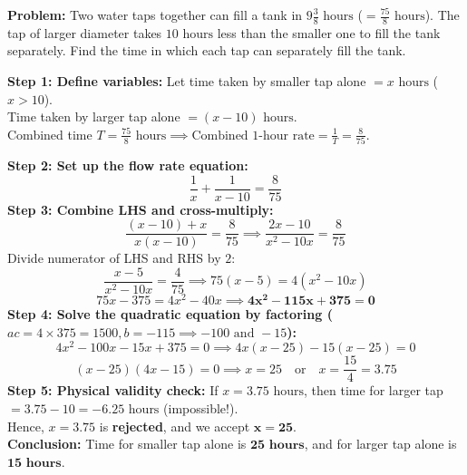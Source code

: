 \documentclass[10pt,a4paper]{article}
\begin{document}
\vspace{0.8mm}
\begin{conceptBox}[title={Worked Archetype 10 $\vert$ Two Water Taps Filling a Tank Together},fonttitle=\bfseries\color{navy}]
  \textbf{Problem:} Two water taps together can fill a tank in $9\frac{3}{8}\text{ hours}$ ($=\frac{75}{8}\text{ hours}$). The tap of larger diameter takes $10\text{ hours}$ less than the smaller one to fill the tank separately. Find the time in which each tap can separately fill the tank.
  \par\vspace{0.6mm}\noindent
  \textbf{Step 1: Define variables:}
  Let time taken by smaller tap alone $= x\text{ hours}$ ($x > 10$).\\
  Time taken by larger tap alone $= (x - 10)\text{ hours}$.\\
  Combined time $T = \frac{75}{8}\text{ hours} \implies \text{Combined 1-hour rate} = \frac{1}{T} = \frac{8}{75}$.
  \par\noindent
  \textbf{Step 2: Set up the flow rate equation:}
  $$\frac{1}{x} + \frac{1}{x - 10} = \frac{8}{75}$$
  \textbf{Step 3: Combine LHS and cross-multiply:}
  $$\frac{(x - 10) + x}{x(x - 10)} = \frac{8}{75} \implies \frac{2x - 10}{x^2 - 10x} = \frac{8}{75}$$
  Divide numerator of LHS and RHS by $2$:
  $$\frac{x - 5}{x^2 - 10x} = \frac{4}{75} \implies 75(x - 5) = 4(x^2 - 10x)$$
  $$75x - 375 = 4x^2 - 40x \implies \mathbf{4x^2 - 115x + 375 = 0}$$
  \textbf{Step 4: Solve the quadratic equation by factoring ($ac = 4 \times 375 = 1500, b = -115 \implies -100 \text{ and } -15$):}
  $$4x^2 - 100x - 15x + 375 = 0 \implies 4x(x - 25) - 15(x - 25) = 0$$
  $$(x - 25)(4x - 15) = 0 \implies x = 25 \quad \text{or} \quad x = \frac{15}{4} = 3.75$$
  \textbf{Step 5: Physical validity check:}
  If $x = 3.75\text{ hours}$, then time for larger tap $= 3.75 - 10 = -6.25\text{ hours}$ (impossible!).\\
  Hence, $x = 3.75$ is \textbf{rejected}, and we accept $\mathbf{x = 25}$.\\
  \textbf{Conclusion:} Time for smaller tap alone is $\mathbf{25\text{ hours}}$, and for larger tap alone is $\mathbf{15\text{ hours}}$.
\end{conceptBox}

\newpage

\thispagestyle{fancy}
\vspace*{0mm}
\end{document}
